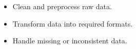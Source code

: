 \documentclass[letterpaper,10pt,english]{sphinxmanual}
\begin{document}
\subsubsection*{}
\begin{itemize}
\item {} 
\sphinxAtStartPar
Clean and preprocess raw data.

\item {} 
\sphinxAtStartPar
Transform data into required formats.

\item {} 
\sphinxAtStartPar
Handle missing or inconsistent data.

\end{itemize}
\end{document}
